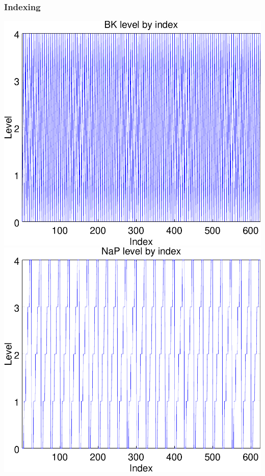 \documentclass{beamer}
\theoremstyle{plain}
\theoremstyle{definition}
\begin{document}
\begin{frame}\frametitle{Indexing}
  \begin{center}
    \includegraphics[scale=.32]{BKfrequency.pdf}%
    \includegraphics[scale=.32]{NaPfrequency.pdf}
  \end{center}
\end{frame}
\end{document}
